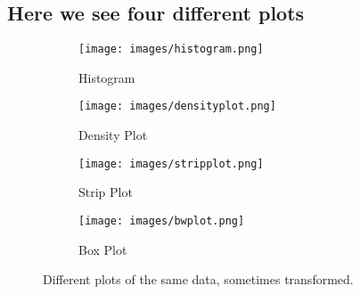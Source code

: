 \documentclass[10pt,fullpage, a4paper, titlepage]{article}
\begin{document}
\subsection{Here we see four different plots}
\begin{figure}[htbp]
    \centering
    \begin{subfigure}[b]{0.45\textwidth} %
        \centering %
        \texttt{[image: images/histogram.png]} 
        \caption{Histogram} %
        \label{fig:histogram}
    \end{subfigure}
    \hfill %
    \begin{subfigure}[b]{0.45\textwidth}
        \centering 
        \texttt{[image: images/densityplot.png]}
        \caption{Density Plot}
        \label{fig:density}
    \end{subfigure}
    
    \vspace{1em} %

    \begin{subfigure}[b]{0.45\textwidth}
        \centering 
        \texttt{[image: images/stripplot.png]}
        \caption{Strip Plot}
        \label{fig:stripplot}
    \end{subfigure}
    \hfill 
    \begin{subfigure}[b]{0.45\textwidth}
        \centering 
        \texttt{[image: images/bwplot.png]}
        \caption{Box Plot}
        \label{fig:boxplot}
    \end{subfigure}
    \caption{Different plots of the same data, sometimes transformed.}
    \label{fig:overview}
\end{figure}
\end{document}
